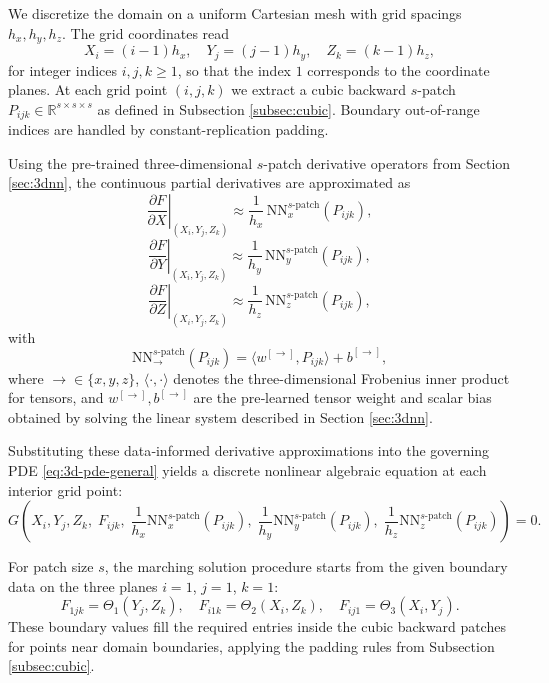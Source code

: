 \documentclass[pdflatex,sn-mathphys-num]{sn-jnl}%
\newcommand{\rev}[1]{\textcolor{red}{#1}}
\theoremstyle{thmstyleone}%
\theoremstyle{thmstyletwo}%
\theoremstyle{thmstylethree}%
\begin{document}
{We discretize the domain on a uniform Cartesian mesh with grid spacings $h_x,h_y,h_z$. The grid coordinates read
\[
X_i = (i-1) h_x,\quad Y_j = (j-1) h_y,\quad Z_k = (k-1) h_z,
\]
for integer indices $i,j,k\ge 1$, so that the index $1$ corresponds to the coordinate planes. At each grid point $(i,j,k)$ we extract a cubic backward $s$-patch $P_{ijk}\in\mathbb{R}^{s\times s\times s}$ as defined in Subsection \rev{\ref{subsec:cubic}}. Boundary out-of-range indices are handled by constant-replication padding.

Using the pre-trained three-dimensional $s$-patch derivative operators from Section \rev{\ref{sec:3dnn}}, the continuous partial derivatives are approximated as
\[
\left.\frac{\partial F}{\partial X}\right|_{(X_i,Y_j,Z_k)}
\approx \frac{1}{h_x}\, \mathrm{NN}_x^{s\text{-patch}}(P_{ijk}),
\]
\[
\left.\frac{\partial F}{\partial Y}\right|_{(X_i,Y_j,Z_k)}
\approx \frac{1}{h_y}\, \mathrm{NN}_y^{s\text{-patch}}(P_{ijk}),
\]
\[
\left.\frac{\partial F}{\partial Z}\right|_{(X_i,Y_j,Z_k)}
\approx \frac{1}{h_z}\, \mathrm{NN}_z^{s\text{-patch}}(P_{ijk}),
\]
with
\[
\mathrm{NN}_{\to}^{s\text{-patch}}(P_{ijk})
=\bigl\langle w^{[\to]}, P_{ijk}\bigr\rangle + b^{[\to]},
\]
where $\to\in\{x,y,z\}$, $\langle\cdot,\cdot\rangle$ denotes the three-dimensional Frobenius inner product for tensors, and $w^{[\to]},b^{[\to]}$ are the pre‑learned tensor weight and scalar bias obtained by solving the linear system described in Section \rev{\ref{sec:3dnn}}.

Substituting these data‑informed derivative approximations into the governing PDE \eqref{eq:3d-pde-general} yields a discrete nonlinear algebraic equation at each interior grid point:
\begin{equation}
G\left(X_i,Y_j,Z_k,\;F_{ijk},\;
\frac{1}{h_x}\mathrm{NN}_x^{s\text{-patch}}(P_{ijk}),\;
\frac{1}{h_y}\mathrm{NN}_y^{s\text{-patch}}(P_{ijk}),\;
\frac{1}{h_z}\mathrm{NN}_z^{s\text{-patch}}(P_{ijk})
\right)=0.
\label{eq:discrete-3d-pde}
\end{equation}

For patch size $s$, the marching solution procedure starts from the given boundary data on the three planes $i=1$, $j=1$, $k=1$:
\[
F_{1jk}=\Theta_1(Y_j,Z_k),\quad
F_{i1k}=\Theta_2(X_i,Z_k),\quad
F_{ij1}=\Theta_3(X_i,Y_j).
\]
These boundary values fill the required entries inside the cubic backward patches for points near domain boundaries, applying the padding rules from Subsection \rev{\ref{subsec:cubic}}.

}
\end{document}
